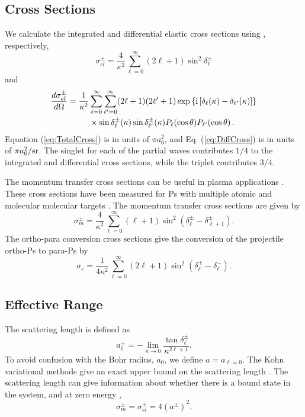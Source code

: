 \documentclass[preprint,showpacs,preprintnumbers,amsmath,amssymb,longbibliography,pra,aps]{revtex4-1}
\newcommand{\ii}{{\rm{i}}}
\begin{document}
\subsection{Cross Sections}
We calculate the integrated and differential elastic cross sections using \cite{Bransden2003}, respectively,
\begin{equation}
\label{eq:TotalCross}
\sigma_{el}^\pm = \frac{4}{\kappa^2} \sum_{\ell=0}^\infty (2\ell+1) \sin^2 \delta_\ell^\pm
\end{equation}
and
\begin{align}
\label{eq:DiffCross}
\nonumber \frac{d\sigma_{el}^\pm}{d\Omega} = \frac{1}{\kappa^2} & \sum_{\ell=0}^\infty \sum_{\ell^\prime=0}^\infty (2\ell+1)(2\ell^\prime+1) \exp\left\{\ii \left[\delta_\ell(\kappa) - \delta_{\ell^\prime}(\kappa) \right] \right\} \\
& \times \sin\delta_\ell^\pm(\kappa) \sin\delta_{\ell^\prime}^\pm(\kappa) P_\ell(\cos\theta) P_{\ell^\prime}(\cos\theta)\,.
\end{align}
Equation (\ref{eq:TotalCross}) is in units of $\pi a_0^2$, and Eq. (\ref{eq:DiffCross}) is in units of $\pi a_0^2 / \rm{sr}$. The singlet for each of the partial waves contributes $1/4$ to the integrated and differential cross sections, while the triplet contributes $3/4$.

The momentum transfer cross sections can be useful in plasma applications \cite{Wang2014, McEachran2014}. These cross sections have been measured for Ps with multiple atomic and molecular molecular targets \cite{Nagashima1998,Saito2003}. The momentum transfer cross sections are given by \cite{Bransden2003}
\begin{equation}
\label{eq:MomentumCross}
\sigma_{m}^\pm = \frac{4}{\kappa^2} \sum_{\ell=0}^\infty (\ell+1) \sin^2 (\delta_\ell^\pm - \delta_{\ell+1}^\pm) .
\end{equation}
The ortho-para conversion cross sections give the conversion of the projectile ortho-Ps to para-Ps by \cite{Hara1975}
\begin{equation}
\label{eq:OrthoParaCross}
\sigma_{c} = \frac{1}{4 \kappa^2} \sum_{\ell=0}^\infty (2 \ell+1) \sin^2 (\delta_\ell^+ - \delta_\ell^-).
\end{equation}


\subsection{Effective Range}

The scattering length is defined as \cite{Bransden2003}
\begin{equation}
\label{eq:ScatLen}
a_\ell^\pm = -\lim_{\kappa \to 0} \frac{\tan{\delta_\ell^\pm}}{\kappa^{2\ell+1}}.
\end{equation}
To avoid confusion with the Bohr radius, $a_0$, we define $a = a_{\ell=0}$. The Kohn variational methods give an exact upper bound on the scattering length \cite{Joachain1979}. The scattering length can give information about whether there is a bound state in the system, and at zero energy \cite{Buckman1989},
\begin{equation}
\label{eq:ScatLenCross}
\sigma_m^\pm = \sigma_{el}^\pm = 4 (a^\pm)^2 .
\end{equation}
\end{document}
